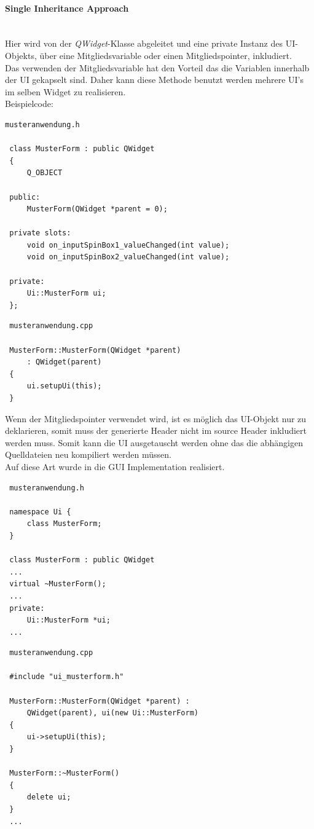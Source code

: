 \paragraph{Single Inheritance Approach}\mbox{}\\
Hier wird von der \textit{QWidget}-Klasse abgeleitet und eine private Instanz des UI-Objekts, über eine Mitgliedsvariable oder einen Mitgliedspointer, inkludiert.\\
Das verwenden der Mitgliedsvariable hat den Vorteil das die Variablen innerhalb der UI gekapselt sind. Daher kann diese Methode benutzt werden mehrere UI’s im selben Widget zu realisieren.\\Beispielcode:
\begin{lstlisting}
musteranwendung.h

 class MusterForm : public QWidget
 {
     Q_OBJECT

 public:
     MusterForm(QWidget *parent = 0);

 private slots:
     void on_inputSpinBox1_valueChanged(int value);
     void on_inputSpinBox2_valueChanged(int value);

 private:
     Ui::MusterForm ui;
 };
\end{lstlisting}
\begin{lstlisting}
 musteranwendung.cpp

 MusterForm::MusterForm(QWidget *parent)
     : QWidget(parent)
 {
     ui.setupUi(this);
 }
\end{lstlisting}
\newpage
\noindent
Wenn der Mitgliedspointer verwendet wird, ist es möglich das UI-Objekt nur zu deklarieren, somit muss der generierte Header nicht im source Header inkludiert werden muss. Somit kann die UI ausgetauscht werden ohne das die abhängigen Quelldateien neu kompiliert werden müssen.\\ Auf diese Art wurde in \EBP die GUI Implementation realisiert. 
\begin{lstlisting}
 musteranwendung.h

 namespace Ui {
     class MusterForm;
 }

 class MusterForm : public QWidget
 ...
 virtual ~MusterForm();
 ...
 private:
     Ui::MusterForm *ui;
 ...
\end{lstlisting}
\begin{lstlisting}
 musteranwendung.cpp

 #include "ui_musterform.h"

 MusterForm::MusterForm(QWidget *parent) :
     QWidget(parent), ui(new Ui::MusterForm)
 {
     ui->setupUi(this);
 }

 MusterForm::~MusterForm()
 {
     delete ui;
 }
 ...
\end{lstlisting}
\newpage
